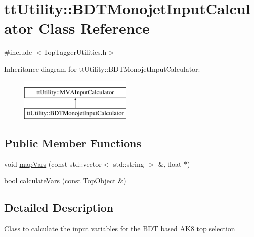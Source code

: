 \hypertarget{classttUtility_1_1BDTMonojetInputCalculator}{\section{tt\-Utility\-:\-:B\-D\-T\-Monojet\-Input\-Calculator Class Reference}
\label{classttUtility_1_1BDTMonojetInputCalculator}
}


{\ttfamily \#include $<$Top\-Tagger\-Utilities.\-h$>$}

Inheritance diagram for tt\-Utility\-:\-:B\-D\-T\-Monojet\-Input\-Calculator\-:\begin{figure}[H]
\begin{center}
\leavevmode
\includegraphics[height=2.000000cm]{classttUtility_1_1BDTMonojetInputCalculator}
\end{center}
\end{figure}
\subsection*{Public Member Functions}
\begin{DoxyCompactItemize}
\item 
void \hyperlink{classttUtility_1_1BDTMonojetInputCalculator_a1200a5b57fd939ee71cfac9ff1885f08}{map\-Vars} (const std\-::vector$<$ std\-::string $>$ \&, float $\ast$)
\item 
bool \hyperlink{classttUtility_1_1BDTMonojetInputCalculator_a77d0d0a41b482f0522866584093cb71d}{calculate\-Vars} (const \hyperlink{classTopObject}{Top\-Object} \&)
\end{DoxyCompactItemize}


\subsection{Detailed Description}
Class to calculate the input variables for the B\-D\-T based A\-K8 top selection 

